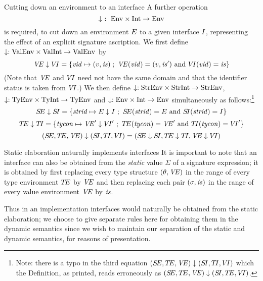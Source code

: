 \begin{definition}{Cutting down an environment to an interface}
A further operation
\[ \downarrow\ :\ \Env\times\Int\to\Env\]
is required, to cut down an environment $E$ to a given interface $I$,
representing the effect of an explicit signature ascription. We first
define $\downarrow: {\rm ValEnv}\times{\rm ValInt}\to{\rm ValEnv}$ by
\[\textit{V\kern-.05emE\/}\downarrow\mbox{$V\!I$} = \{\textit{vid\/}\mapsto(v,\textit{is\/})\;;\;\textit{V\kern-.05emE\/}(\textit{vid\/}) = (v,\textit{is\/}')\ {\rm and}\ \mbox{$V\!I$}(\textit{vid\/}) = \textit{is\/}\}\]
(Note that $\textit{V\kern-.05emE\/}$ and $\mbox{$V\!I$}$ need not have the same
domain and that the identifier status is taken from $\mbox{$V\!I$}$.) 
We then define $\downarrow: {\rm StrEnv} \times {\rm StrInt} \to {\rm StrEnv}$,
$\downarrow: {\rm TyEnv} \times{\rm TyInt}\to{\rm TyEnv}$ and
$\downarrow: {\rm Env}\times{\rm Int}\to{\rm Env}$ simultaneously as
follows:\footnote{Note: there is a typo in the third equation 
$(\mbox{$S\!E$},\mbox{$T\!E$},\textit{V\kern-.05emE\/})\downarrow(\mbox{$S\!I$},\mbox{$T\!I$},\mbox{$V\!I$})$
which the Definition, as printed, reads erroneously as
$(\mbox{$S\!E$},\mbox{$T\!E$},\textit{V\kern-.05emE\/})\downarrow(\mbox{$S\!I$},\mbox{$T\!E$},\mbox{$V\!I$})$.}
\label{downarrowdef}
\begin{equation*}
\SE\downarrow\SI  =  \{\strid\mapsto\E\downarrow\I\ ;\
          	\SE(\strid)=\E\ {\rm and}\ \SI(\strid)=\I\}
\end{equation*}
\begin{equation*}
\TE\downarrow\TI =  \{\tycon\mapsto \VE'\downarrow\VI'\ ;\ 
               \TE(\tycon) = \VE'\ {\rm and}\ \TI(\tycon) = \VI'\}
\end{equation*}
\begin{equation*}
(\SE,\TE,\VE)\downarrow(\SI,\TI,\VI)  = 
               (\SE\downarrow\SI, \TE\downarrow\TI, \VE\downarrow\VI)
\end{equation*}
\end{definition}

\begin{clause}{Static elaboration naturally implements interfaces}
It is important to note that an interface can also be obtained from the
\emph{static} value $\Sigma$ of a signature expression; 
it is obtained by first replacing every type
structure $(\theta, \textit{V\kern-.05emE\/})$
in the range of every type environment $\mbox{$T\!E$}$ by $\textit{V\kern-.05emE\/}$
and then replacing each pair $(\sigma,\textit{is\/})$ in the range of every value
environment $\textit{V\kern-.05emE\/}$ by $\textit{is\/}$.

Thus in an implementation interfaces would naturally be obtained from the
static elaboration; we choose to give separate rules here for obtaining them
in the dynamic semantics since we wish to maintain our separation of the
static and dynamic semantics, for reasons of presentation.
\end{clause}

